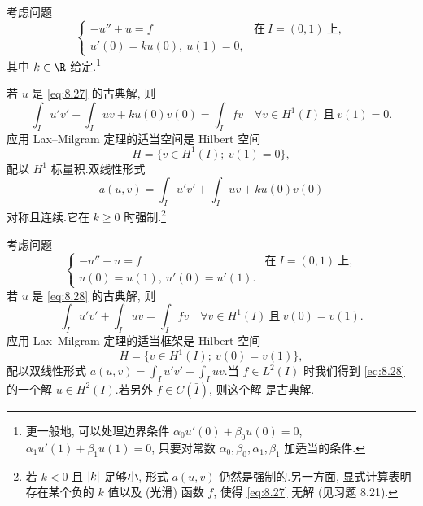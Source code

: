 \begin{example}
\label{ex:8.6}
考虑问题
\begin{equation}
\begin{cases}
-u''+u=f & \text{在}\ I=(0,1)\ \text{上},\\
u'(0)=ku(0),\ u(1)=0,
\end{cases}
\label{eq:8.27}
\end{equation}
其中 $k\in\R$ 给定.\footnote{更一般地, 可以处理边界条件
$\alpha_0u'(0)+\beta_0u(0)=0$, $\alpha_1u'(1)+\beta_1u(1)=0$, 只要对常数
$\alpha_0,\beta_0,\alpha_1,\beta_1$ 加适当的条件.}

若 $u$ 是 \eqref{eq:8.27} 的古典解, 则
\begin{equation*}
\int_I u'v'+\int_I uv+ku(0)v(0)=\int_I fv
\quad\forall v\in H^1(I)\ \text{且}\ v(1)=0.
\end{equation*}
应用 Lax--Milgram 定理的适当空间是 Hilbert 空间
\begin{equation*}
H=\{v\in H^1(I);\ v(1)=0\},
\end{equation*}
配以 $H^1$ 标量积.双线性形式
\begin{equation*}
a(u,v)=\int_I u'v'+\int_I uv+ku(0)v(0)
\end{equation*}
对称且连续.它在 $k\ge0$ 时强制.\footnote{若 $k<0$ 且 $\left|k\right|$ 足够小,
形式 $a(u,v)$ 仍然是强制的.另一方面, 显式计算表明存在某个负的 $k$ 值以及
(光滑) 函数 $f$, 使得 \eqref{eq:8.27} 无解 (见习题 8.21).}
\end{example}

\begin{example}[周期边界条件]
\label{ex:8.7}
考虑问题
\begin{equation}
\begin{cases}
-u''+u=f & \text{在}\ I=(0,1)\ \text{上},\\
u(0)=u(1),\ u'(0)=u'(1).
\end{cases}
\label{eq:8.28}
\end{equation}
若 $u$ 是 \eqref{eq:8.28} 的古典解, 则
\begin{equation}
\int_I u'v'+\int_I uv=\int_I fv\quad\forall v\in H^1(I)\ \text{且}\ v(0)=v(1).
\label{eq:8.29}
\end{equation}
应用 Lax--Milgram 定理的适当框架是 Hilbert 空间
\begin{equation*}
H=\{v\in H^1(I);\ v(0)=v(1)\},
\end{equation*}
配以双线性形式 $a(u,v)=\int_I u'v'+\int_I uv$.当 $f\in L^2(I)$ 时我们得到
\eqref{eq:8.28} 的一个解 $u\in H^2(I)$.若另外 $f\in C(\bar I)$, 则这个解
是古典解.
\end{example}

